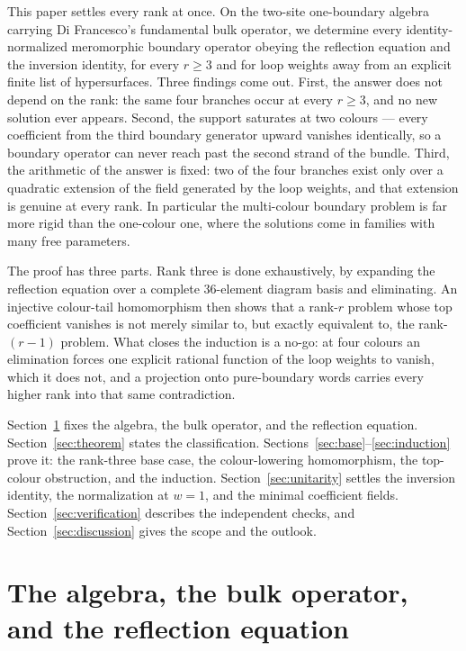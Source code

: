 \documentclass[
  aps,pre,
  reprint,
  superscriptaddress,
  amsmath,amssymb,
  floatfix
]{revtex4-2}
\theoremstyle{plain}
\theoremstyle{definition}
\theoremstyle{remark}
\begin{document}
This paper settles every rank at once. On the two-site one-boundary algebra
carrying Di Francesco's fundamental bulk operator, we determine every
identity-normalized meromorphic boundary operator obeying the reflection
equation and the inversion identity, for every $r\ge3$ and for loop weights
away from an explicit finite list of hypersurfaces. Three findings come out.
First, the answer does not depend on the rank: the same four branches occur at
every $r\ge3$, and no new solution ever appears. Second, the support saturates
at two colours --- every coefficient from the third boundary generator upward
vanishes identically, so a boundary operator can never reach past the second
strand of the bundle. Third, the arithmetic of the answer is fixed: two of the
four branches exist only over a quadratic extension of the field generated by
the loop weights, and that extension is genuine at every rank. In particular
the multi-colour boundary problem is far more rigid than the one-colour one,
where the solutions come in families with many free parameters.

The proof has three parts. Rank three is done exhaustively, by expanding the
reflection equation over a complete $36$-element diagram basis and eliminating.
An injective colour-tail homomorphism then shows that a rank-$r$ problem whose
top coefficient vanishes is not merely similar to, but exactly equivalent to,
the rank-$(r-1)$ problem. What closes the induction is a no-go: at four colours
an elimination forces one explicit rational function of the loop weights to
vanish, which it does not, and a projection onto pure-boundary words carries
every higher rank into that same contradiction.

Section~\ref{sec:setting} fixes the algebra, the bulk operator, and the
reflection equation. Section~\ref{sec:theorem} states the classification.
Sections~\ref{sec:base}--\ref{sec:induction} prove it: the rank-three base
case, the colour-lowering homomorphism, the top-colour obstruction, and the
induction. Section~\ref{sec:unitarity} settles the inversion identity, the
normalization at $w=1$, and the minimal coefficient fields.
Section~\ref{sec:verification} describes the independent checks, and
Section~\ref{sec:discussion} gives the scope and the outlook.

\section{The algebra, the bulk operator, and the reflection equation}
\label{sec:setting}
\end{document}
